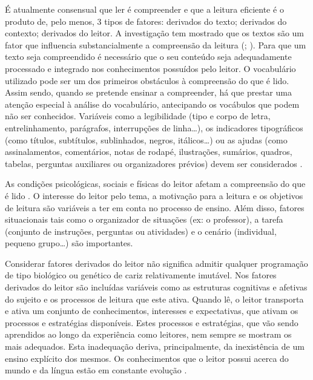\documentclass[
  oneside,
  11pt, a4paper,
  footinclude=true,
  headinclude=true,
  cleardoublepage=empty
]{scrbook}
\begin{document}
É atualmente consensual que ler é compreender e que a leitura eficiente é o produto de, pelo menos, 3 tipos de fatores: derivados do texto; derivados do contexto; derivados do  leitor. A  investigação  tem  mostrado que os textos são  um  fator que influencia substancialmente a compreensão da leitura (\citealp{Curto}; \citealp{Giasson}). Para que um texto seja compreendido é necessário que o seu conteúdo seja adequadamente processado e integrado nos conhecimentos possuídos pelo leitor. O vocabulário utilizado pode ser um dos primeiros obstáculos à compreensão do que é lido. Assim sendo, quando se pretende ensinar a compreender, há que prestar uma atenção especial à análise do vocabulário, antecipando os vocábulos que podem não ser conhecidos. Variáveis  como  a  legibilidade  (tipo  e  corpo  de  letra,  entrelinhamento, parágrafos, interrupções de linha…), os indicadores tipográficos (como títulos, subtítulos, sublinhados, negros, itálicos…) ou as ajudas (como assinalamentos, comentários, notas de rodapé, ilustrações, sumários, quadros, tabelas, perguntas auxiliares ou organizadores prévios) devem ser considerados \citep{RibeiroViana2010}.

As condições psicológicas, sociais e físicas do leitor afetam a compreensão do que é lido \citep{Giasson}. O interesse do leitor pelo tema, a motivação para a leitura e os objetivos de leitura são variáveis a ter em conta no processo de ensino. Além disso, fatores situacionais tais como o organizador de situações (ex: o professor), a tarefa (conjunto de instruções, perguntas ou atividades)  e o  cenário  (individual, pequeno  grupo…) são importantes.

Considerar fatores derivados do leitor não significa admitir qualquer programação de tipo biológico ou genético de cariz relativamente imutável. Nos fatores derivados do leitor são incluídas variáveis como as estruturas cognitivas e afetivas do sujeito e os processos de leitura que este ativa. Quando lê, o leitor transporta e ativa um conjunto de conhecimentos,  interesses  e  expectativas,  que  ativam  os  processos  e  estratégias disponíveis.  Estes  processos  e  estratégias,  que  vão  sendo  aprendidos  ao  longo  da experiência como leitores, nem sempre se mostram os mais adequados. Esta inadequação deriva, principalmente, da inexistência de um ensino explícito dos mesmos. Os conhecimentos que o leitor possui acerca do mundo e da língua estão em constante evolução \citep{RibeiroViana2010}.
\end{document}
